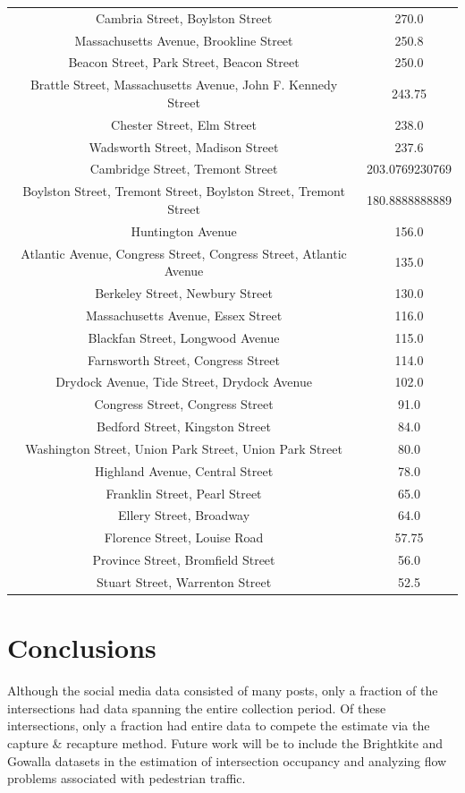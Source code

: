 \documentclass[twocolumn,10pt]{asme2ej}
\begin{document}
\begin{tabular}{c | c |}
Cambria Street, Boylston Street & 270.0 \\
Massachusetts Avenue, Brookline Street & 250.8 \\
Beacon Street, Park Street, Beacon Street & 250.0 \\
Brattle Street, Massachusetts Avenue, John F. Kennedy Street & 243.75 \\
Chester Street, Elm Street & 238.0 \\
Wadsworth Street, Madison Street & 237.6 \\
Cambridge Street, Tremont Street & 203.0769230769 \\
Boylston Street, Tremont Street, Boylston Street, Tremont Street & 180.8888888889 \\
Huntington Avenue & 156.0 \\
Atlantic Avenue, Congress Street, Congress Street, Atlantic Avenue & 135.0 \\
Berkeley Street, Newbury Street & 130.0 \\
Massachusetts Avenue, Essex Street & 116.0 \\
Blackfan Street, Longwood Avenue & 115.0 \\
Farnsworth Street, Congress Street & 114.0 \\
Drydock Avenue, Tide Street, Drydock Avenue & 102.0 \\
Congress Street, Congress Street & 91.0 \\
Bedford Street, Kingston Street & 84.0 \\
Washington Street, Union Park Street, Union Park Street & 80.0 \\
Highland Avenue, Central Street & 78.0 \\
Franklin Street, Pearl Street & 65.0 \\
Ellery Street, Broadway & 64.0 \\
Florence Street, Louise Road & 57.75 \\
Province Street, Bromfield Street & 56.0 \\
Stuart Street, Warrenton Street & 52.5 \\
\end{tabular}

\section{Conclusions}
Although the social media data consisted of many posts, only a fraction of the intersections had data spanning the entire collection period. Of these intersections, only a fraction had entire data to compete the estimate via the capture \& recapture method. Future work will be to include the Brightkite and Gowalla datasets in the estimation of intersection occupancy and analyzing flow problems associated with pedestrian traffic.
\end{document}
